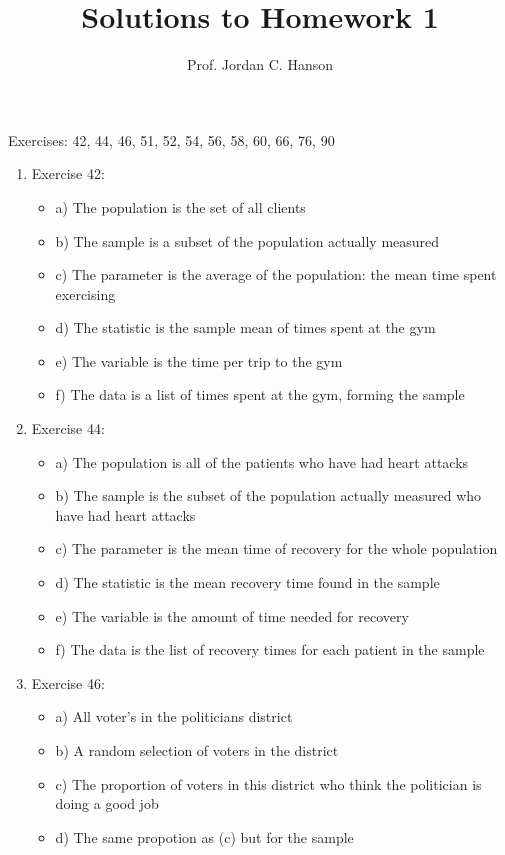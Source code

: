 \documentclass{article}
\begin{document}
\title{Solutions to Homework 1}
\author{Prof. Jordan C. Hanson}

\maketitle

Exercises: 42, 44, 46, 51, 52, 54, 56, 58, 60, 66, 76, 90

\begin{enumerate}
\item Exercise 42: 
\begin{itemize}
\item a) The population is the set of all clients
\item b) The sample is a subset of the population actually measured
\item c) The parameter is the average of the population: the mean time spent exercising
\item d) The statistic is the sample mean of times spent at the gym
\item e) The variable is the time per trip to the gym
\item f) The data is a list of times spent at the gym, forming the sample
\end{itemize}
\item Exercise 44: 
\begin{itemize}
\item a) The population is all of the patients who have had heart attacks
\item b) The sample is the subset of the population actually measured who have had heart attacks
\item c) The parameter is the mean time of recovery for the whole population 
\item d) The statistic is the mean recovery time found in the sample
\item e) The variable is the amount of time needed for recovery
\item f) The data is the list of recovery times for each patient in the sample
\end{itemize}
\item Exercise 46: 
\begin{itemize}
\item a) All voter's in the politicians district
\item b) A random selection of voters in the district
\item c) The proportion of voters in this district who think the politician is doing a good job
\item d) The same propotion as (c) but for the sample

\end{itemize}
\end{enumerate}
\end{document}
